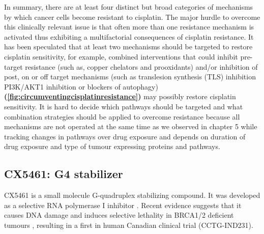 In summary, there are at least four distinct but broad categories of mechanisms by which cancer cells become resistant to cisplatin. The major hurdle to overcome this clinically relevant issue is that often more than one resistance mechanism is activated thus exhibiting a multifactorial consequences of cisplatin resistance. It has been speculated that at least two mechanisms should be targeted to restore cisplatin sensitivity, for example, combined interventions that could inhibit pre-target resistance (such as, copper chelators and prooxidants) and/or inhibition of post, on  or off target mechanisms (such as translesion synthesis (TLS) inhibition PI3K/AKT1 inhibition or blockers of autophagy)  \textbf{(\autoref{fig:circumventingcisplatinresistance})} may possibly restore cisplatin sensitivity. It is hard to decide which pathways should be targeted and what combination strategies should be applied to overcome resistance because all mechanisms are not operated at the same time as we observed in chapter 5 while tracking changes in pathways over drug exposure and depends on duration of drug exposure and type of tumour expressing proteins and pathways.

\subsection{CX5461: G4 stabilizer} 
CX5461 is a small molecule G-quadruplex stabilizing compound. It was developed as a selective RNA polymerase I inhibitor \cite{drygin2011targeting}. Recent evidence suggests that it causes DNA damage and induces selective lethality in BRCA1/2 deficient tumours \cite{xu2017cx}, resulting in a first in human Canadian clinical trial (CCTG-IND231). 
 
